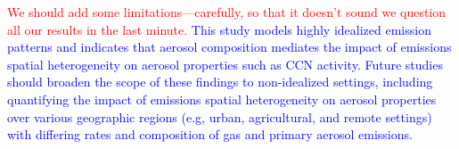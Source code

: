 \documentclass[journal abbreviation, manuscript]{copernicus}
\begin{document}
\textcolor{red}{We should add some limitations---carefully, so that it
  doesn't sound we question all our results in the last minute.}
 \textcolor{blue}{This study models highly idealized emission patterns and indicates that 
aerosol composition mediates the impact of emissions spatial heterogeneity 
on aerosol properties such as CCN activity. Future studies should broaden 
the scope of these findings to non-idealized settings, including quantifying 
the impact of emissions spatial heterogeneity on aerosol properties over
various geographic regions (e.g, urban, agricultural, and remote settings) 
with differing rates and composition of gas and primary aerosol emissions.}













\appendix
\section{}    %

\subsection{}     %


\noappendix       %
\end{document}
